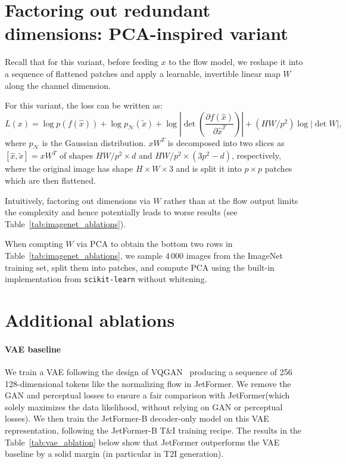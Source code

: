 \documentclass{article} %
\newcommand{\name}{JetFormer\xspace}
\begin{document}
\section{Factoring out redundant dimensions: PCA-inspired variant} \label{sec:factor_out_pca}


Recall that for this variant, before feeding $x$ to the flow model, we reshape it into a sequence of flattened patches and apply a learnable, invertible linear map $W$ along the channel dimension.

For this variant, the loss can be written as:
\begin{equation*}
    L(x) = \log p(f(\hat x)) + \log p_\mathcal{N}(\tilde x) + \log \left| \det \left(\frac{\partial f(\hat x)}{\partial \hat x^T}\right)\right| + (HW/p^2)\log | \det W |,
\end{equation*}
where $p_\mathcal{N}$ is the Gaussian distribution. $x W^T$ is decomposed into two slices as $[\hat x, \tilde x] = x W^T$ of shapes $HW/p^2 \times d$ and $HW/p^2 \times (3 p^2 - d)$, respectively, where the original image has shape $H\times W\times3$ and is split it into $p\times p$ patches which are then flattened.

Intuitively, factoring out dimensions via $W$ rather than at the flow output limits the complexity and hence potentially leads to worse results (see Table~\ref{tab:imagenet_ablations}).

When compting $W$ via PCA to obtain the bottom two rows in Table~\ref{tab:imagenet_ablations}, we sample $4\,000$ images from the ImageNet training set, split them into patches, and compute PCA using the built-in implementation from \texttt{scikit-learn} without whitening.

\section{Additional ablations} \label{app:additional-ablations}

\paragraph{VAE baseline} We train a VAE following the design of VQGAN~\citep{rombach2021high} producing a sequence of 256 128-dimensional tokens like the normalizing flow in \name. We remove the GAN and perceptual losses to ensure a fair comparison with \name (which solely maximizes the data likelihood, without relying on GAN or perceptual losses). We then train the \name-B decoder-only model on this VAE representation, following the \name-B T\&I training recipe. The results in the Table~\ref{tab:vae_ablation} below show that \name outperforms the VAE baseline by a solid margin (in particular in T2I generation).
\end{document}
